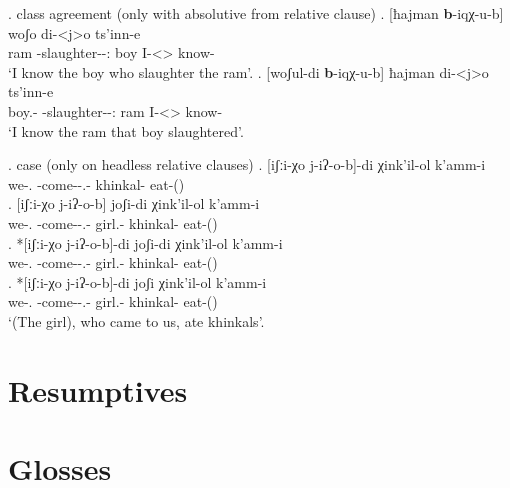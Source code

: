 \ex. class agreement (only with absolutive from relative clause)
	\ag. [ħajman \textbf{b}-iqχ-u-b] woʃo di-<j>o ts'inn-e \\
			ram {\Nanf-slaughter-\Pst-\Ptcp:\Pst} boy {I-<\M>\Aff} {know-\Hab}\\
			\glt `I know the boy who slaughter the ram'.
	\bg. [woʃul-di \textbf{b}-iqχ-u-b] ħajman di-<j>o ts'inn-e \\
			{boy.\Obl-\Erg} {\Nanf-slaughter-\Pst-\Ptcp:\Pst} ram {I-<\M>\Aff} {know-\Hab}\\
			\glt `I know the ram that boy slaughtered'.	
			
\ex. case (only on headless relative clauses)
	\ag. [iʃːi-χo j-iʔ-o-b]-di χink'il-ol k'amm-i\\
			{we-\Add.\Lat} {\M-come-\Pst-\Ptcp.\Pst-\Erg} {khinkal-\Pl} {eat-\Pst(\Aor)}\\
	\bg. [iʃːi-χo j-iʔ-o-b] joʃi-di χink'il-ol k'amm-i\\
			{we-\Add.\Lat} {\M-come-\Pst-\Ptcp.\Pst-\Erg} {girl.\Obl-\Erg} {khinkal-\Pl} {eat-\Pst(\Aor)}\\
	\bg. *[iʃːi-χo j-iʔ-o-b]-di joʃi-di χink'il-ol k'amm-i\\
			{we-\Add.\Lat} {\M-come-\Pst-\Ptcp.\Pst-\Erg} {girl.\Obl-\Erg} {khinkal-\Pl} {eat-\Pst(\Aor)}\\
	\bg. *[iʃːi-χo j-iʔ-o-b]-di joʃi χink'il-ol k'amm-i\\
			{we-\Add.\Lat} {\M-come-\Pst-\Ptcp.\Pst-\Erg} {girl.\Obl-\Erg} {khinkal-\Pl} {eat-\Pst(\Aor)}\\
			\glt `(The girl), who came to us, ate khinkals'.

\section{Resumptives}


\section*{Glosses}
\small
\printglosses


\normalsize
